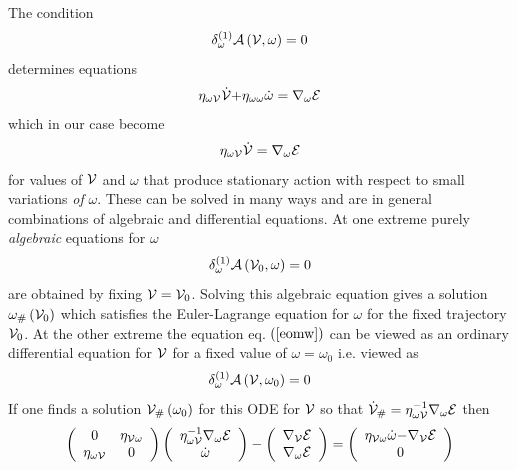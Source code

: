 The condition 
\begin{equation}
\delta _{\omega }^{\left( 1\right) }{\cal A}\left( {\cal V},\omega \right) =0
\label{eomw}
\end{equation}
determines equations 
\begin{equation}
\eta _{\omega {\cal V}}{\cal \dot{V}+}\eta _{\omega \omega }{\cal \dot{\omega%
}}=\nabla _{\omega }{\cal E}
\end{equation}%
which in our case become 
\begin{equation}
\eta _{\omega {\cal V}}{\cal \dot{V}}=\nabla _{\omega }{\cal E}  \label{elw}
\end{equation}%
for values of ${\cal V}$ and $\omega $ that produce stationary action with
respect to small variations {\em of }$\omega .$ These can be solved in many
ways and are in general combinations of algebraic and differential
equations. At one extreme purely {\em algebraic} equations for $\omega $ 
\begin{equation}
\delta _{\omega }^{\left( 1\right) }{\cal A}\left( {\cal V}_{0},\omega
\right) =0
\end{equation}%
are obtained by fixing ${\cal V}={\cal V}_{0}$. Solving this algebraic
equation gives a solution $\omega _{\#}\left( {\cal V}_{0}\right) $ which
satisfies the Euler-Lagrange equation for $\omega $ for the fixed trajectory 
${\cal V}_{0}$. At the other extreme the equation eq. $\left( \ref{eomw}%
\right) $ can be viewed as an ordinary differential equation for ${\cal V}$
for a fixed value of $\omega =\omega _{0}$ i.e. viewed as 
\begin{equation}
\delta _{\omega }^{\left( 1\right) }{\cal A}\left( {\cal V},\omega
_{0}\right) =0
\end{equation}%
If one finds a solution ${\cal V}_{\#}\left( \omega _{0}\right) $ for this
ODE for ${\cal V}$ so that ${\cal \dot{V}}_{\#}=\eta _{\omega {\cal V}%
}^{-1}\nabla _{\omega }{\cal E}$ then 
\begin{equation}
\left( 
\begin{array}{cc}
0 & \eta _{{\cal V\omega }} \\ 
\eta _{\omega {\cal V}} & 0%
\end{array}%
\right) \left( 
\begin{array}{c}
\eta _{\omega {\cal V}}^{-1}\nabla _{\omega }{\cal E} \\ 
{\cal \dot{\omega}}%
\end{array}%
\right) -\left( 
\begin{array}{c}
\nabla _{{\cal V}}{\cal E} \\ 
\nabla _{\omega }{\cal E}%
\end{array}%
\right) =\left( 
\begin{array}{c}
\eta _{{\cal V\omega }}{\cal \dot{\omega}-}\nabla _{{\cal V}}{\cal E} \\ 
0%
\end{array}%
\right)
\end{equation}%
